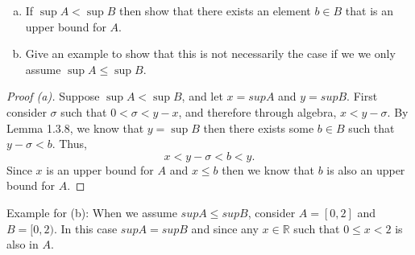 \documentclass[12pt]{article}
\makeatletter
\theoremstyle{homework}
\newenvironment{exercise}[1]
{\def\@currentlabel{#1}\exercisecore}
{\endexercisecore}
\newcommand{\Reals}{\ensuremath{\mathbb R}}
\let\RR\Reals
\makeatother
\begin{document}
\begin{exercise}{1.3.9}  
\begin{enumerate}[(a)]
\item
If $\sup A < \sup B$ then show that there exists an element $b\in B$ that is an upper bound for $A$.
\item Give an example to show that this is not necessarily the case
if we we only assume $\sup A \le \sup B$.
\end{enumerate}
\end{exercise}
\begin{proof}[Proof (a)] Suppose $\sup A < \sup B$, and let $x = sup A$ and $y = sup B$. First consider 
  $\sigma$ such that  $0 < \sigma < y-x$, and therefore through algebra, $x < y - \sigma$. By Lemma 1.3.8, we know that
  $y = \sup B$ then there exists some $b \in B$ such that  $y - \sigma < b$. Thus,
  \begin{equation*}
    x < y - \sigma < b < y.
  \end{equation*} 
  Since $x$ is an upper bound for $A$ and $x \le b$ then we know that $b$ is also an upper bound for $A$. 
\end{proof}
\vspace{.5in}
Example for (b): When we assume $sup A \le sup B$, consider $A = [0,2]$ and $B = [0,2)$. In this case $sup A = sup B$
and since any $x \in \RR$ such that $0 \le x < 2$ is also in $A$.
\vspace{1in}
\end{document}
